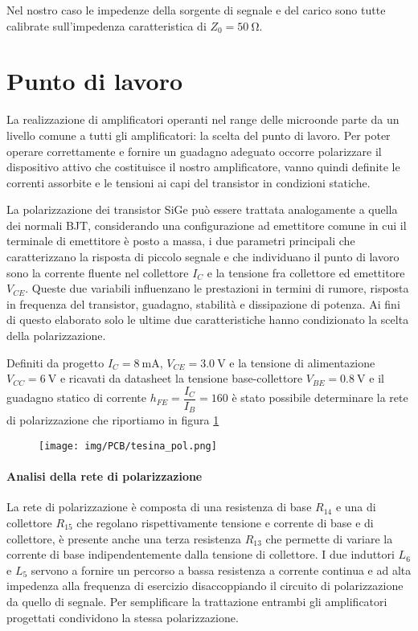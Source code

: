 \documentclass[12pt,oneside]{book}
\begin{document}
Nel nostro caso le impedenze della sorgente di segnale e del carico sono tutte calibrate sull'impedenza caratteristica di $Z_{0}=\SI{50}{\ohm}$.

\section{Punto di lavoro}
\label{sub_q_point}
La realizzazione di amplificatori operanti nel range delle microonde parte da un livello comune a tutti gli amplificatori: la scelta del punto di lavoro. Per poter operare correttamente e fornire un guadagno adeguato occorre polarizzare il dispositivo attivo che costituisce il nostro amplificatore, vanno quindi definite le correnti assorbite e le tensioni ai capi del transistor in condizioni statiche.

La polarizzazione dei transistor SiGe può essere trattata analogamente a quella dei normali BJT, considerando una configurazione ad emettitore comune in cui il terminale di emettitore è posto a massa, i due parametri principali che caratterizzano la risposta di piccolo segnale e che individuano il punto di lavoro sono la corrente fluente nel collettore $I_C$ e la tensione fra collettore ed emettitore $V_{CE}$. Queste due variabili influenzano le prestazioni in termini di rumore, risposta in frequenza del transistor, guadagno, stabilità e dissipazione di potenza. Ai fini di questo elaborato solo le ultime due caratteristiche hanno condizionato la scelta della polarizzazione.

Definiti da progetto $I_{C}=\SI{8}{\milli\ampere}$, $V_{CE}=\SI{3.0}{\volt}$ e la tensione di alimentazione $V_{CC}=\SI{6}{\volt}$ e ricavati da datasheet la tensione base-collettore $V_{BE} = \SI{0.8}{\volt}$ e il guadagno statico di corrente $h_{FE} = \dfrac{I_C}{I_B}=160$ è stato possibile determinare la rete di polarizzazione che riportiamo in figura \ref{pol_net}

\begin{figure}[!htbp]
    \centering
        \texttt{[image: img/PCB/tesina\_pol.png]}
        \caption{}
        \label{pol_net}
    \hfill
\end{figure}

\paragraph{Analisi della rete di polarizzazione}
La rete di polarizzazione è composta di una resistenza di base $R_{14}$ e una di collettore $R_{15}$ che regolano rispettivamente tensione e corrente di base e di collettore, è presente anche una terza resistenza $R_{13}$ che permette di variare la corrente di base indipendentemente dalla tensione di collettore. I due induttori $L_6$ e $L_5$ servono a fornire un percorso a bassa resistenza a corrente continua e ad alta impedenza alla frequenza di esercizio disaccoppiando il circuito di polarizzazione da quello di segnale. Per semplificare la trattazione entrambi gli amplificatori progettati condividono la stessa polarizzazione.
\end{document}
